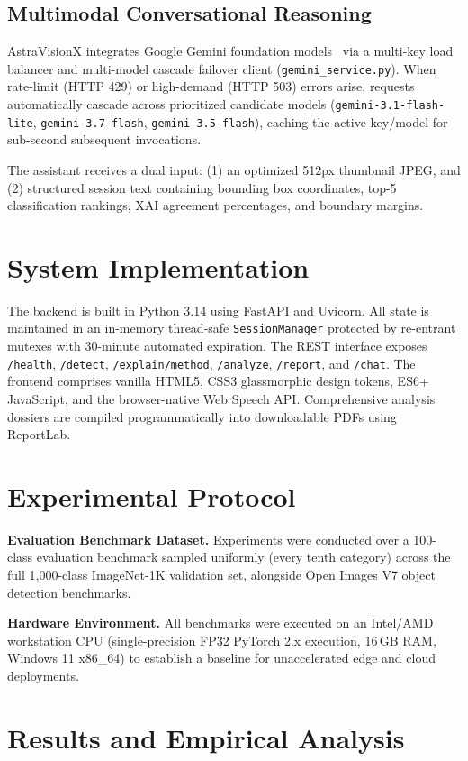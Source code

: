 \documentclass[journal,10pt,twocolumn]{IEEEtran}
\begin{document}
\subsection{Multimodal Conversational Reasoning}
AstraVisionX integrates Google Gemini foundation models~\cite{geminiteam2024gemini} via a multi-key load balancer and multi-model cascade failover client (\texttt{gemini\_service.py}). When rate-limit (HTTP 429) or high-demand (HTTP 503) errors arise, requests automatically cascade across prioritized candidate models (\texttt{gemini-3.1-flash-lite}, \texttt{gemini-3.7-flash}, \texttt{gemini-3.5-flash}), caching the active key/model for sub-second subsequent invocations. 

The assistant receives a dual input: (1) an optimized 512px thumbnail JPEG, and (2) structured session text containing bounding box coordinates, top-5 classification rankings, XAI agreement percentages, and boundary margins.

\section{System Implementation}
The backend is built in Python 3.14 using FastAPI and Uvicorn. All state is maintained in an in-memory thread-safe \texttt{SessionManager} protected by re-entrant mutexes with 30-minute automated expiration. The REST interface exposes \texttt{/health}, \texttt{/detect}, \texttt{/explain/method}, \texttt{/analyze}, \texttt{/report}, and \texttt{/chat}. The frontend comprises vanilla HTML5, CSS3 glassmorphic design tokens, ES6+ JavaScript, and the browser-native Web Speech API. Comprehensive analysis dossiers are compiled programmatically into downloadable PDFs using ReportLab.

\section{Experimental Protocol}
\noindent\textbf{Evaluation Benchmark Dataset.} Experiments were conducted over a 100-class evaluation benchmark sampled uniformly (every tenth category) across the full 1,000-class ImageNet-1K validation set, alongside Open Images V7 object detection benchmarks.

\noindent\textbf{Hardware Environment.} All benchmarks were executed on an Intel/AMD workstation CPU (single-precision FP32 PyTorch 2.x execution, 16\,GB RAM, Windows 11 x86\_64) to establish a baseline for unaccelerated edge and cloud deployments.

\section{Results and Empirical Analysis}
\end{document}
